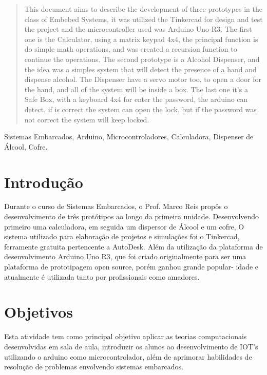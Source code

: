 \documentclass[conference]{IEEEtran}
\begin{document}
\begin{abstract}
This document aims to describe the development of three prototypes in the class of Embebed Systems,
it was utilized the Tinkercad for design and test the project and the microcontroller used
was Arduino Uno R3. The first one is the Calculator, using a matrix keypad 4x4,
the principal function is do simple math operations, and was created a recursion function
to continue the operations. The second prototype is a Alcohol Dispenser, and the idea was a
simples system that will detect the presence of a hand and dispense alcohol.
The Dispenser have a servo motor too, to open a door for the hand, and all of the system 
will be inside a box. The last one it's a Safe Box, with a keyboard 4x4 for enter the password, 
the arduino can detect, if is correct the system can open the lock, but if the password was not correct
the system will keep locked.
\end{abstract}

\begin{IEEEkeywords}
Sistemas Embarcados, Arduino, Microcontroladores, Calculadora, Dispenser de Álcool, Cofre.
\end{IEEEkeywords}

\section{Introdução}
Durante o curso de Sistemas Embarcados, o Prof. Marco
Reis propôs o desenvolvimento de três protótipos ao longo
da primeira unidade. Desenvolvendo primeiro uma calculadora,
em seguida um dispersor de Álcool e um cofre, O sistema
utilizado para elaboração de projetos e simulações foi o
Tinkercad, ferramente gratuita pertencente a AutoDesk. Além
da utilização da plataforma de desenvolvimento Arduino Uno
R3, que foi criado originalmente para ser uma plataforma
de prototipagem open source, porém ganhou grande popular-
idade e atualmente é utilizada tanto por profissionais como
amadores.\cite{barrett2012arduino}

\section{Objetivos}
Esta atividade tem como principal objetivo aplicar as teorias computacionais desenvolvidas em sala de aula,
introduzir os alunos ao desenvolvimento de IOT's utilizando o arduino como microcontrolador, além de aprimorar
habilidades de resolução de problemas envolvendo 
sistemas embarcados.\cite{louis2016working}
\end{document}
